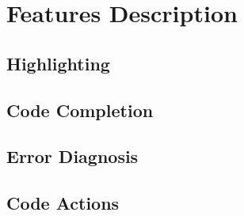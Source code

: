 \documentclass[../main.tex]{subfiles}
\begin{document}
\section{Features Description}
\subsection{Highlighting}
\subsection{Code Completion}
\subsection{Error Diagnosis}
\subsection{Code Actions}
\end{document}
